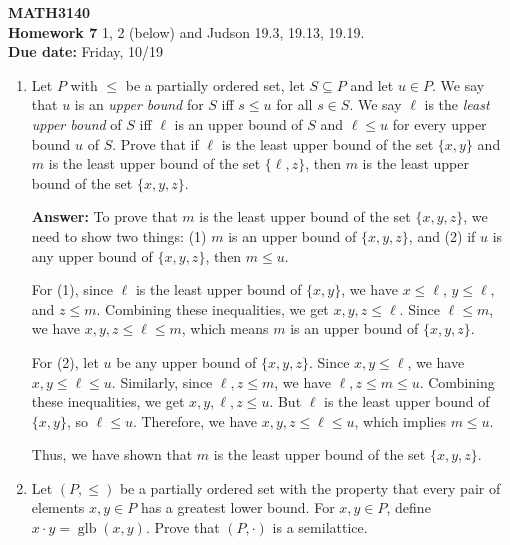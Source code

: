 \documentclass[12pt,reqno]{amsart}
\newcommand{\probskip}{\vskip1cm}
\newcommand{\subject}{MATH}
\newcommand{\coursenumber}{3140}
\begin{document}
\thispagestyle{empty}

\noindent \textbf{\subject \coursenumber}\\
{\bf Homework 7} 
\vskip1cm
 1, 2 (below) and Judson 19.3, 19.13, 19.19.\\
{\bf Due date:} Friday, 10/19

\bigskip

\begin{enumerate}[{\bf 1.}]

\item %
Let $P$ with $\leq$ be a partially ordered set, let $S \subseteq P$ and let
$u\in P$.  We say that $u$ is an \emph{upper bound} for $S$ iff $s\leq u$ for
all $s \in S$.  We say $\ell$ is the \emph{least upper bound} of $S$ iff $\ell$
is an upper bound of $S$ and $\ell \leq u$ for every upper bound $u$ of $S$.
Prove that if $\ell$ is the least upper bound of the set $\{x, y\}$ and $m$ is
the least upper bound of the set $\{\ell, z\}$, then $m$ is the least upper
bound of the set $\{x, y, z\}$.

\textbf{Answer:} To prove that $m$ is the least upper bound of the set $\{x, y, z\}$, we need to show two things: (1) $m$ is an upper bound of $\{x, y, z\}$, and (2) if $u$ is any upper bound of $\{x, y, z\}$, then $m \leq u$.

For (1), since $\ell$ is the least upper bound of $\{x, y\}$, we have $x \leq \ell$, $y \leq \ell$, and $z \leq m$. Combining these inequalities, we get $x, y, z \leq \ell$. Since $\ell \leq m$, we have $x, y, z \leq \ell \leq m$, which means $m$ is an upper bound of $\{x, y, z\}$.

For (2), let $u$ be any upper bound of $\{x, y, z\}$. Since $x, y \leq \ell$, we have $x, y \leq \ell \leq u$. Similarly, since $\ell, z \leq m$, we have $\ell, z \leq m \leq u$. Combining these inequalities, we get $x, y, \ell, z \leq u$. But $\ell$ is the least upper bound of $\{x, y\}$, so $\ell \leq u$. Therefore, we have $x, y, z \leq \ell \leq u$, which implies $m \leq u$.

Thus, we have shown that $m$ is the least upper bound of the set $\{x, y, z\}$.

\probskip

\item
Let $(P, \leq)$ be a partially ordered set with the property that every pair of
elements $x, y \in P$ has a greatest lower bound. For $x, y\in P$, define 
$x \cdot y = \operatorname{glb}(x,y)$. Prove that $(P, \cdot)$ is a semilattice.


\end{enumerate}
\end{document}
